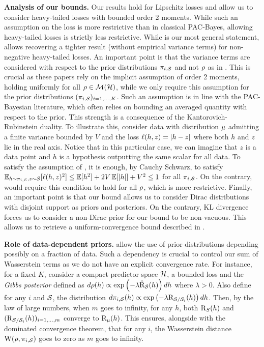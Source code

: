 \documentclass{article}
\begin{document}
\textbf{Analysis of our bounds.} Our results hold for Lipschitz losses and allow us to consider heavy-tailed losses with bounded order 2 moments.
While such an assumption on the loss is more restrictive than in classical PAC-Bayes, allowing heavy-tailed losses is strictly less restrictive. 
While  is our most general statement,  allows recovering a tighter result (without empirical variance terms) for non-negative heavy-tailed losses. 
An important point is that the variance terms are considered with respect to the prior distributions $\P_{i,\S}$  and not $\Q$ as in \cite{haddouche2023pac,chugg2023unified}. This is crucial as these papers rely on the implicit assumption of order 2 moments, holding uniformly for all $\Q\in\Mcal(\H)$, while we only require this assumption for the prior distributions $(\P_{i,\S})_{i=1,\dots,K}$.
Such an assumption is in line with the PAC-Bayesian literature, which often relies on bounding an averaged quantity with respect to the prior.
This strength is a consequence of the Kantorovich-Rubinstein duality.
To illustrate this, consider \iid data with distribution $\D$ admitting a finite variance bounded by $V$ and the loss $\loss(h,z)= |h-z|$ where both $h$ and $z$ lie in the real axis.
Notice that in this particular case, we can imagine that $z$ is a data point and $h$ is a hypothesis outputting the same scalar for all data.
To satisfy the assumption of , it is enough, by Cauchy Schwarz, to satisfy  $\EE_{h\sim \P_{i,\S},z\sim\S}[\loss(h,z)^2] \le \EE[h^2] + 2V\EE[|h|] +V^2 \leq 1$ for all $\P_{i,\S}$.
On the contrary, \cite{haddouche2023pac,chugg2023unified} would require this condition to hold for all $\Q$, which is more restrictive.
Finally, an important point is that our bound allows us to consider Dirac distributions with disjoint support as priors and posteriors.
On the contrary, KL divergence forces us to consider a non-Dirac prior for our bound to be non-vacuous. 
This allows us to retrieve a uniform-convergence bound described in .

\textbf{Role of data-dependent priors.} 
 allow the use of prior distributions depending possibly on a fraction of data.
Such a dependency is crucial to control our sum of Wasserstein terms as we do not have an explicit convergence rate.
For instance, for a fixed $K$, consider a compact predictor space $\H$, a bounded loss and the \emph{Gibbs posterior} defined as $d\Q(h) \propto \exp\left(-\lambda \Riskhat_{\S}(h)\right)dh$ where $\lambda>0$.
Also define for any $i$ and $\S$, the distribution $d\P_{i,\S}(h) \propto \exp\left(-\lambda \Risk_{\S/\S_i}(h)\right)dh$. Then, by the law of large numbers, when $m$ goes to infinity, for any $h$, both $\Risk_S(h)$ and $(\Risk_{\S/\S_i}(h))_{i=1,\dots,m}$ converge to $\Risk_\D(h)$. 
This ensures, alongside with the dominated convergence theorem, that for any $i$, the Wasserstein distance $\W(\Q,\P_{i,\S})$ goes to zero as $m$ goes to infinity.  
\end{document}
